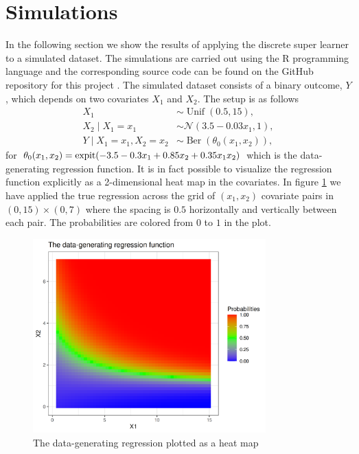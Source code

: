 \documentclass[./main.tex]{subfiles}
\begin{document}
\section{Simulations} \label{sec:simulations}
In the following section we show the results of applying the discrete super learner to a simulated dataset. The simulations are carried out using the R programming language and the corresponding source code can be found on the GitHub repository for this project \parencite{github}. The simulated dataset consists of a binary outcome, $Y$, which depends on two covariates $X_1$ and $X_2$. The setup is as follows
\begin{align*}
    X_1 &\sim \operatorname{Unif}(0.5, 15),\\
    X_2 \mid X_1 = x_1 &\sim \mathcal{N}(3.5-0.03x_1, 1),\\
    Y \mid X_1 = x_1, X_2 = x_2 &\sim \operatorname{Ber}(\theta_0(x_1, x_2)),
\end{align*}
for $\theta_0(x_1, x_2) = \operatorname{expit}({-3.5 - 0.3x_1 + 0.85x_2 + 0.35x_1x_2})$ which is the data-generating regression function. It is in fact possible to visualize the regression function explicitly as a 2-dimensional heat map in the covariates. In figure \ref{fig:trueplot} we have applied the true regression across the grid of $ (x_1, x_2) $ covariate pairs in $ (0, 15) \times (0,7) $ where the spacing is $ 0.5 $ horizontally and vertically between each pair. The probabilities are colored from $ 0 $ to $ 1 $ in the plot. 
\begin{figure}[H]
    \centering
    \includegraphics[width=0.8\textwidth]{figures/trueplot.png}
    \caption{The data-generating regression plotted as a heat map}
    \label{fig:trueplot}
\end{figure}
\end{document}
